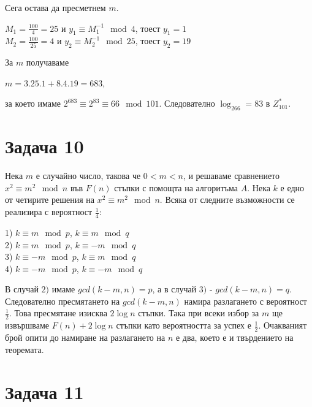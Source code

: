 \documentclass{article}
\begin{document}
\justify
Сега остава да пресметнем $m$.
\begin{center}
    $M_1 = \frac{100}{4} = 25$ и $y_1 \equiv M_1^{-1} \mod 4$, тоест $y_1 = 1$ \\
    $M_2 = \frac{100}{25} = 4$ и $y_2 \equiv M_2^{-1} \mod 25$, тоест $y_2 = 19$
\end{center}
За $m$ получаваме 
\begin{center}
    $m = 3.25.1 + 8.4.19 = 683$,
\end{center}
за което имаме $2^{683} \equiv 2^{83} \equiv 66 \mod 101$. Следователно $\log_266 = 83$ в $Z^*_{101}$.

\section*{Задача 10}

\justify
Нека $m$ е случайно число, такова че $0 < m < n$, и решаваме сравнението $x^2 \equiv m^2 \mod n$ във $F(n)$ стъпки с помощта на алгоритъма $A$. Нека $k$ е едно от четирите решения на $x^2 \equiv m^2 \mod n$. Всяка от следните възможности се реализира с вероятност $\frac{1}{4}$:
\begin{center}
    1) $k \equiv m \mod p$, $k \equiv m \mod q$ \\
    2) $k \equiv m \mod p$, $k \equiv -m \mod q$ \\
    3) $k \equiv -m \mod p$, $k \equiv m \mod q$ \\
    4) $k \equiv -m \mod p$, $k \equiv -m \mod q$
\end{center}
В случай $2)$ имаме $gcd(k-m,n) = p$, а в случай $3)$ - $gcd(k-m,n) = q$. Следователно пресмятането на $gcd(k-m,n)$ намира разлагането с вероятност $\frac{1}{2}$. Това пресмятане изисква $2\log n$ стъпки. Така при всеки избор за $m$ ще извършваме $F(n) + 2\log n$ стъпки като вероятността за успех е $\frac{1}{2}$. Очакваният брой опити до намиране на разлагането на $n$ е два, което е и твърдението на теоремата.

\section*{Задача 11}
\end{document}
